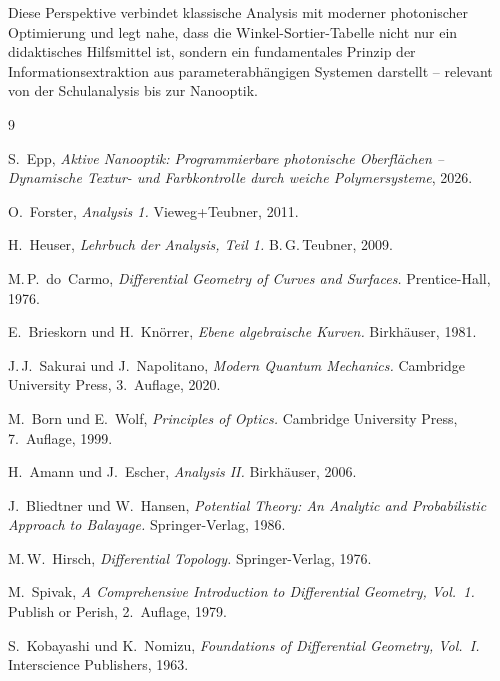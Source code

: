 ﻿\documentclass[12pt, a4paper]{article}
\theoremstyle{definition}
\begin{document}
	Diese Perspektive verbindet klassische Analysis mit moderner photonischer
	Optimierung und legt nahe, dass die Winkel-Sortier-Tabelle nicht nur ein
	didaktisches Hilfsmittel ist, sondern ein fundamentales Prinzip der
	Informationsextraktion aus parameterabhängigen Systemen darstellt -- relevant
	von der Schulanalysis bis zur Nanooptik.
	
	\begin{thebibliography}{9}
		
		S.~Epp,
		\newblock \emph{Aktive Nanooptik: Programmierbare photonische Oberflächen --
			Dynamische Textur- und Farbkontrolle durch weiche Polymersysteme}, 2026.
		
		O.~Forster,
		\newblock \emph{Analysis 1.}
		\newblock Vieweg+Teubner, 2011.
		
		H.~Heuser,
		\newblock \emph{Lehrbuch der Analysis, Teil 1.}
		\newblock B.\,G.\,Teubner, 2009.
		
		M.\,P.~do~Carmo,
		\newblock \emph{Differential Geometry of Curves and Surfaces.}
		\newblock Prentice-Hall, 1976.
		
		E.~Brieskorn und H.~Knörrer,
		\newblock \emph{Ebene algebraische Kurven.}
		\newblock Birkhäuser, 1981.
		
		J.\,J.~Sakurai und J.~Napolitano,
		\newblock \emph{Modern Quantum Mechanics.}
		\newblock Cambridge University Press, 3.~Auflage, 2020.
		
		M.~Born und E.~Wolf,
		\newblock \emph{Principles of Optics.}
		\newblock Cambridge University Press, 7.~Auflage, 1999.
		
		H.~Amann und J.~Escher,
		\newblock \emph{Analysis II.}
		\newblock Birkhäuser, 2006.
		
		J.~Bliedtner und W.~Hansen,
		\newblock \emph{Potential Theory: An Analytic and Probabilistic Approach to Balayage.}
		\newblock Springer-Verlag, 1986.
		
		M.\,W.~Hirsch,
		\newblock \emph{Differential Topology.}
		\newblock Springer-Verlag, 1976.
		
		M.~Spivak,
		\newblock \emph{A Comprehensive Introduction to Differential Geometry, Vol.~1.}
		\newblock Publish or Perish, 2.~Auflage, 1979.
		
		S.~Kobayashi und K.~Nomizu,
		\newblock \emph{Foundations of Differential Geometry, Vol.~I.}
		\newblock Interscience Publishers, 1963.
		

\end{thebibliography}
\end{document}
